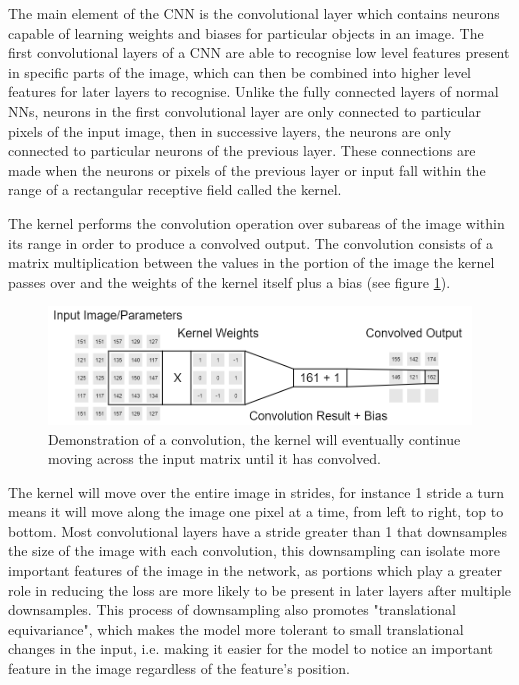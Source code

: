 \documentclass{l4proj}
\begin{document}
The main element of the CNN is the convolutional layer which contains neurons capable of learning weights and biases for particular objects in an image. The first convolutional layers of a CNN are able to recognise low level features present in specific parts of the image, which can then be combined into higher level features for later layers to recognise. Unlike the fully connected layers of normal NNs, neurons in the first convolutional layer are only connected to particular pixels of the input image, then in successive layers, the neurons are only connected to particular neurons of the previous layer. These connections are made when the neurons or pixels of the previous layer or input fall within the range of a rectangular receptive field called the kernel. 

The kernel performs the convolution operation over subareas of the image within its range in order to produce a convolved output. The convolution consists of a matrix multiplication between the values in the portion of the image the kernel passes over and the weights of the kernel itself plus a bias (see figure \ref{fig:convolution}).

\begin{figure}[h]
    \centering
    \includegraphics[width=1.0\linewidth]{images/Convolution.png}    

    \caption{Demonstration of a convolution, the kernel will eventually continue moving across the input matrix until it has convolved.}

    \label{fig:convolution} 
\end{figure}

The kernel will move over the entire image in strides, for instance 1 stride a turn means it will move along the image one pixel at a time, from left to right, top to bottom. Most convolutional layers have a stride greater than 1 that downsamples the size of the image with each convolution, this downsampling can isolate more important features of the image in the network, as portions which play a greater role in reducing the loss are more likely to be present in later layers after multiple downsamples. This process of downsampling also promotes "translational equivariance", which makes the model more tolerant to small translational changes in the input, i.e. making it easier for the model to notice an important feature in the image regardless of the feature's position. 
\end{document}
